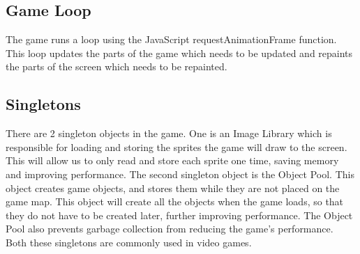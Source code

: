 \subsection*{Game Loop}
The game runs a loop using the JavaScript requestAnimationFrame function. This loop updates the parts 
of the game which needs to be updated and repaints the parts of the screen which needs to be repainted.

\subsection*{Singletons}
There are 2 singleton objects in the game. One is an Image Library which is responsible for loading 
and storing the sprites the game will draw to the screen. This will allow us to only read and store 
each sprite one time, saving memory and improving performance. The second singleton object is the 
Object Pool. This object creates game objects, and stores them while they are not placed on the game 
map. This object will create all the objects when the game loads, so that they do not have to be 
created later, further improving performance. The Object Pool also prevents garbage collection from 
reducing the game's performance. Both these singletons are commonly used in video games.

